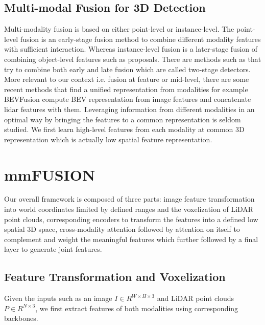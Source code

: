 \documentclass[10pt,twocolumn,letterpaper]{article}
\begin{document}
\subsection{Multi-modal Fusion for 3D Detection}
Multi-modality fusion is based on either point-level or instance-level. The point-level fusion \cite{liang2018deep,huang2020epnet,yin2021multimodal,li2022voxel} is an early-stage fusion method to combine different modality features with sufficient interaction. Whereas instance-level fusion \cite{chen2017multi,ku2018joint,yoo20203d} is a later-stage fusion of combining object-level features such as proposals. There are methods such as \cite{sindagi2019mvx} that try to combine both early and late fusion which are called two-stage detectors. 
More relevant to our context i.e. fusion at feature or mid-level, there are some recent methods that find a unified representation from modalities for example BEVFusion \cite{yoo20203d, liu2022bevfusion,liang2022bevfusion} 
compute BEV representation from image features and concatenate lidar features with them. Leveraging information from different modalities in an optimal way by bringing the features to a common representation is seldom studied. We first learn high-level features from each modality at common 3D representation which is actually low spatial feature representation.   

\section{mmFUSION}
Our overall framework is composed of three parts: image feature transformation into world coordinates limited by defined ranges and the voxelization of LiDAR point clouds, corresponding encoders to transform the features into a defined low spatial 3D space, cross-modality attention followed by attention on itself to complement and weight the meaningful features which further followed by a final layer to generate joint features.

\subsection{Feature Transformation and Voxelization}
Given the inputs such as an image $I \in R^{W\times H \times 3} $ and LiDAR point clouds $P \in R^{N\times 3}$, we first extract features of both modalities using corresponding backbones. 
\end{document}
